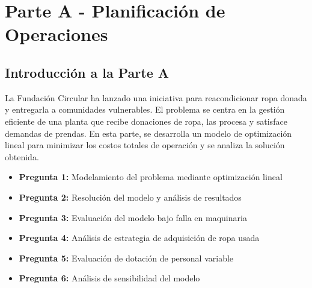 \section{Parte A - Planificación de Operaciones}
\label{sec:parteA}

\begin{center}
\end{center}

\vspace{1cm}

\subsection*{Introducción a la Parte A}

La Fundación Circular ha lanzado una iniciativa para reacondicionar ropa donada y entregarla a comunidades vulnerables. El problema se centra en la gestión eficiente de una planta que recibe donaciones de ropa, las procesa y satisface demandas de prendas. En esta parte, se desarrolla un modelo de optimización lineal para minimizar los costos totales de operación y se analiza la solución obtenida.

\begin{itemize}
    \item \textbf{Pregunta 1:} Modelamiento del problema mediante optimización lineal
    \item \textbf{Pregunta 2:} Resolución del modelo y análisis de resultados
    \item \textbf{Pregunta 3:} Evaluación del modelo bajo falla en maquinaria
    \item \textbf{Pregunta 4:} Análisis de estrategia de adquisición de ropa usada
    \item \textbf{Pregunta 5:} Evaluación de dotación de personal variable
    \item \textbf{Pregunta 6:} Análisis de sensibilidad del modelo
\end{itemize}






